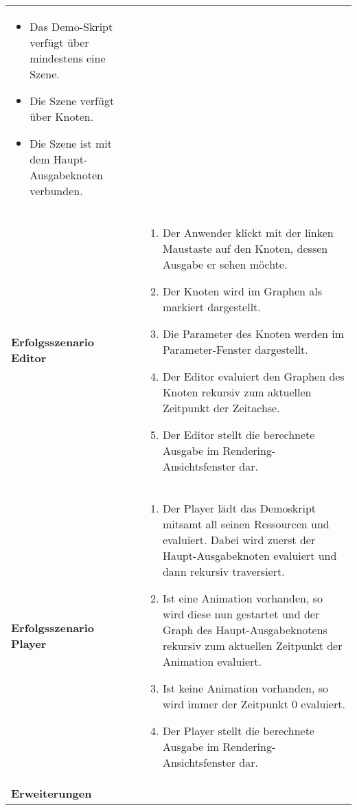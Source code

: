 \begin{longtabu}{p{0.5\textwidth}p{0.5\textwidth}}
\begin{itemize}
{                    vorhanden.}
            \item{Das Demo-Skript verfügt über mindestens eine Szene.}
            \item{Die Szene verfügt über Knoten.}
            \item{Die Szene ist mit dem Haupt-Ausgabeknoten verbunden.}
        \end{itemize} \\
    \cmidrule(r){1-1}\cmidrule(lr){2-2}
    \textbf{Erfolgsszenario Editor} &
        \begin{enumerate}
            \item{Der Anwender klickt mit der linken Maustaste auf den
                    Knoten, dessen Ausgabe er sehen möchte.}
            \item{Der Knoten wird im Graphen als markiert dargestellt.}
            \item{Die Parameter des Knoten werden im Parameter-Fenster
                    dargestellt.}
            \item{Der Editor evaluiert den Graphen des Knoten rekursiv zum
                    aktuellen Zeitpunkt der Zeitachse.}
            \item{Der Editor stellt die berechnete Ausgabe im
                    Rendering-Ansichtsfenster dar.}
        \end{enumerate} \\
    \cmidrule(r){1-1}\cmidrule(lr){2-2}
    \textbf{Erfolgsszenario Player} &
        \begin{enumerate}
            \item{Der Player lädt das Demoskript mitsamt all seinen
                    Ressourcen und evaluiert. Dabei wird zuerst der
                    Haupt-Ausgabeknoten evaluiert und dann rekursiv
                    traversiert.}
            \item{Ist eine Animation vorhanden, so wird diese nun
                    gestartet und der Graph des Haupt-Ausgabeknotens rekursiv zum
                    aktuellen Zeitpunkt der Animation evaluiert.}
            \item{Ist keine Animation vorhanden, so wird immer der
                    Zeitpunkt 0 evaluiert.}
            \item{Der Player stellt die berechnete Ausgabe im
                    Rendering-Ansichtsfenster dar.}
        \end{enumerate} \\
    \cmidrule(r){1-1}\cmidrule(lr){2-2}
        \textbf{Erweiterungen} &

\end{longtabu}
